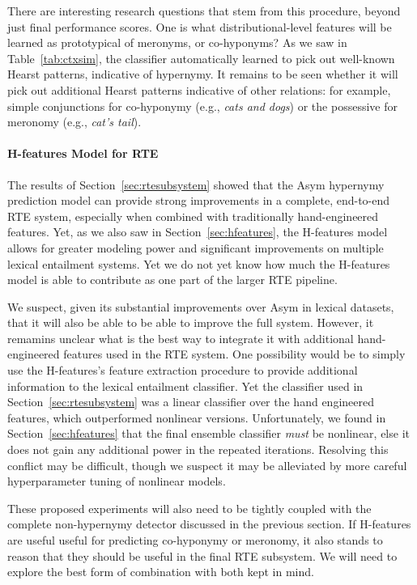 \documentclass[12pt]{article}
\begin{document}
There are interesting research questions that stem from this procedure, beyond
just final performance scores. One is what distributional-level features will
be learned as prototypical of meronyms, or co-hyponyms? As we saw in
Table~\ref{tab:ctxsim}, the classifier automatically learned to pick
out well-known Hearst patterns, indicative of hypernymy. It remains to be seen
whether it will pick out additional Hearst patterns indicative of other
relations: for example, simple conjunctions for co-hyponymy (e.g., {\em cats
and dogs}) or the possessive for meronomy (e.g., {\em cat's tail}).

\paragraph{H-features Model for RTE}

The results of Section~\ref{sec:rtesubsystem} showed that the Asym hypernymy
prediction model can provide strong improvements in a complete, end-to-end RTE
system, especially when combined with traditionally hand-engineered features.
Yet, as we also saw in Section~\ref{sec:hfeatures}, the H-features
model allows for greater modeling power and significant improvements on multiple
lexical entailment systems. Yet we do not yet know how much the H-features
model is able to contribute as one part of the larger RTE pipeline.

We suspect, given its substantial improvements over Asym in lexical datasets,
that it will also be able to be able to improve the full system. However, it
remamins unclear what is the best way to integrate it with additional
hand-engineered features used in the RTE system.  One possibility would be to
simply use the H-features's feature extraction procedure to provide
additional information to the lexical entailment classifier. Yet the classifier
used in Section~\ref{sec:rtesubsystem} was a linear classifier over the hand
engineered features, which outperformed nonlinear versions. Unfortunately, we
found in Section~\ref{sec:hfeatures} that the final ensemble classifier
{\em must} be nonlinear, else it does not gain any additional power in the
repeated iterations. Resolving this conflict may be difficult, though we
suspect it may be alleviated by more careful hyperparameter tuning of nonlinear
models.

These proposed experiments will also need to be tightly coupled with the
complete non-hypernymy detector discussed in the previous section. If H-features
are useful useful for predicting co-hyponymy or meronomy, it also stands to
reason that they should be useful in the final RTE subsystem. We will need to
explore the best form of combination with both kept in mind.
\end{document}
